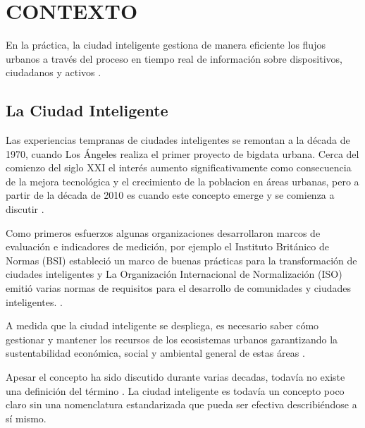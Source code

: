 \documentclass[a4paper,fleqn,spanish]{cas-dc}
\begin{document}
\section{CONTEXTO}\label{marco}


En la práctica,
la ciudad inteligente
gestiona de manera eficiente los flujos urbanos
a través del proceso en tiempo real de información
sobre dispositivos, ciudadanos y activos
\cite{stubinger_understanding_2020}
. 

\subsection{La Ciudad Inteligente}\label{concepto}

Las experiencias tempranas de ciudades inteligentes se remontan a la década
de 1970, cuando Los Ángeles realiza el primer proyecto de bigdata urbana.
Cerca del comienzo del siglo XXI
el interés aumento significativamente como consecuencia de la mejora
tecnológica y el crecimiento de la poblacion en áreas urbanas,
pero a partir de la década de 2010 es cuando este concepto emerge y se comienza a discutir
\cite{stubinger_understanding_2020}.

Como primeros esfuerzos 
algunas organizaciones 
desarrollaron marcos de evaluación e indicadores de medición,
por ejemplo
el Instituto Británico de Normas
(BSI) estableció
un marco de buenas prácticas para la
transformación de ciudades inteligentes
y
La Organización Internacional de Normalización (ISO) emitió
varias normas de requisitos para el desarrollo de comunidades y
ciudades inteligentes.
\cite{aljowder_systematic_2019}.

A medida que
la ciudad inteligente se despliega, es necesario saber cómo
gestionar y mantener los recursos de los ecosistemas urbanos
garantizando la sustentabilidad económica,
social y ambiental general de estas áreas \cite{aljowder_systematic_2019, stubinger_understanding_2020}.

Apesar el concepto ha sido discutido durante varias decadas,
todavía no existe una definición del término
\cite{wahab_systematic_2020}.
La ciudad inteligente es todavía un
concepto poco claro sin una nomenclatura estandarizada que pueda ser
efectiva describiéndose a sí mismo.
\end{document}
